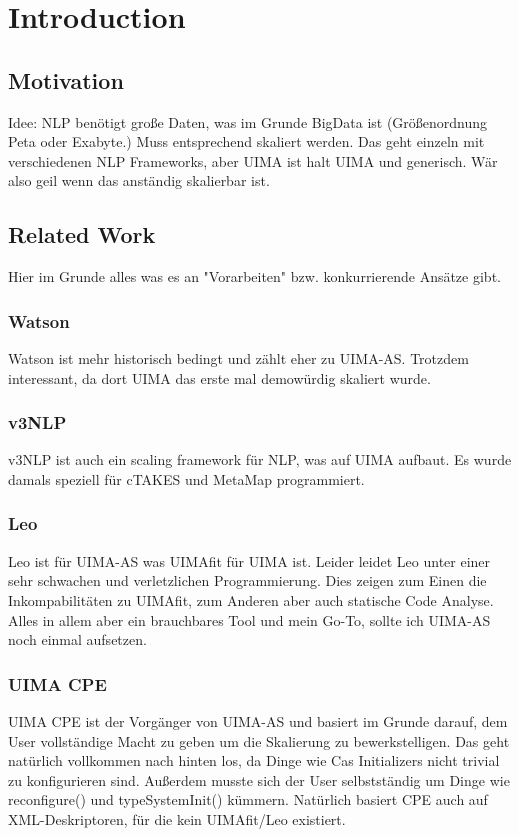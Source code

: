 
\chapter{Introduction}



\section{Motivation}
Idee: NLP benötigt große Daten, was im Grunde BigData ist (Größenordnung Peta oder Exabyte.)
Muss entsprechend skaliert werden. Das geht einzeln mit verschiedenen NLP Frameworks, aber UIMA
ist halt UIMA und generisch. Wär also geil wenn das anständig skalierbar ist.

\section{Related Work}
Hier im Grunde alles was es an "Vorarbeiten" bzw. konkurrierende Ansätze gibt.

\subsection{Watson}
Watson ist mehr historisch bedingt und zählt eher zu UIMA-AS. Trotzdem interessant, da dort UIMA das erste mal demowürdig skaliert wurde.

\subsection{v3NLP}
v3NLP ist auch ein scaling framework für NLP, was auf UIMA aufbaut. Es wurde damals speziell für cTAKES und MetaMap programmiert.

\subsection{Leo}
Leo ist für UIMA-AS was UIMAfit für UIMA ist. Leider leidet Leo unter einer sehr schwachen und verletzlichen Programmierung. Dies zeigen zum Einen die Inkompabilitäten zu UIMAfit, zum Anderen aber auch statische Code Analyse. Alles in allem aber ein brauchbares Tool und mein Go-To, sollte ich UIMA-AS noch einmal aufsetzen.

\subsection{UIMA CPE}
UIMA CPE ist der Vorgänger von UIMA-AS und basiert im Grunde darauf, dem User vollständige Macht zu geben um die Skalierung zu bewerkstelligen. Das geht natürlich vollkommen nach hinten los, da Dinge wie Cas Initializers nicht trivial zu konfigurieren sind. Außerdem musste sich der User selbstständig um Dinge wie reconfigure() und typeSystemInit() kümmern. 
Natürlich basiert CPE auch auf XML-Deskriptoren, für die kein UIMAfit/Leo existiert.

